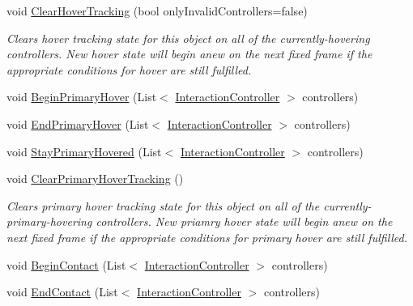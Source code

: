 \begin{DoxyCompactItemize}
\item 
void \mbox{\hyperlink{class_leap_1_1_unity_1_1_interaction_1_1_interaction_behaviour_aeb6b978ba2cb9b28a72d04ec0c3944b3}{Clear\+Hover\+Tracking}} (bool only\+Invalid\+Controllers=false)
\begin{DoxyCompactList}\small\item\em Clears hover tracking state for this object on all of the currently-\/hovering controllers. New hover state will begin anew on the next fixed frame if the appropriate conditions for hover are still fulfilled. \end{DoxyCompactList}\item 
void \mbox{\hyperlink{class_leap_1_1_unity_1_1_interaction_1_1_interaction_behaviour_addb5ab253e3f6556c278f205ada2f509}{Begin\+Primary\+Hover}} (List$<$ \mbox{\hyperlink{class_leap_1_1_unity_1_1_interaction_1_1_interaction_controller}{Interaction\+Controller}} $>$ controllers)
\item 
void \mbox{\hyperlink{class_leap_1_1_unity_1_1_interaction_1_1_interaction_behaviour_a743fa15f979906b13265632db30c2d9c}{End\+Primary\+Hover}} (List$<$ \mbox{\hyperlink{class_leap_1_1_unity_1_1_interaction_1_1_interaction_controller}{Interaction\+Controller}} $>$ controllers)
\item 
void \mbox{\hyperlink{class_leap_1_1_unity_1_1_interaction_1_1_interaction_behaviour_a08154671b75a77ec03b101c17cebe0fd}{Stay\+Primary\+Hovered}} (List$<$ \mbox{\hyperlink{class_leap_1_1_unity_1_1_interaction_1_1_interaction_controller}{Interaction\+Controller}} $>$ controllers)
\item 
void \mbox{\hyperlink{class_leap_1_1_unity_1_1_interaction_1_1_interaction_behaviour_a94d561f0f50a5a0adbf630fad5d599f2}{Clear\+Primary\+Hover\+Tracking}} ()
\begin{DoxyCompactList}\small\item\em Clears primary hover tracking state for this object on all of the currently-\/ primary-\/hovering controllers. New priamry hover state will begin anew on the next fixed frame if the appropriate conditions for primary hover are still fulfilled. \end{DoxyCompactList}\item 
void \mbox{\hyperlink{class_leap_1_1_unity_1_1_interaction_1_1_interaction_behaviour_afe37f016395a6c5834a9c51aab533a35}{Begin\+Contact}} (List$<$ \mbox{\hyperlink{class_leap_1_1_unity_1_1_interaction_1_1_interaction_controller}{Interaction\+Controller}} $>$ controllers)
\item 
void \mbox{\hyperlink{class_leap_1_1_unity_1_1_interaction_1_1_interaction_behaviour_ac75f580c1e1e3136fab5f7cc5764c84d}{End\+Contact}} (List$<$ \mbox{\hyperlink{class_leap_1_1_unity_1_1_interaction_1_1_interaction_controller}{Interaction\+Controller}} $>$ controllers)

\end{DoxyCompactItemize}
